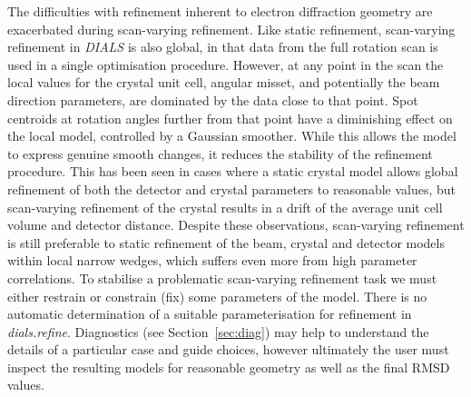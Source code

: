\documentclass[preprint]{iucr}
\newcommand{\dials}{\emph{DIALS}\xspace}
\newcommand{\dialsrefine}{\emph{dials.refine}\xspace}
\begin{document}
The difficulties with refinement inherent to electron diffraction geometry are
exacerbated during scan-varying refinement. Like static
refinement, scan-varying refinement in \dials is also global, in that data from
the full rotation scan is used in a single optimisation procedure. However, at
any point in the scan the local values for the crystal unit cell, angular
misset, and potentially the beam direction parameters, are dominated by the data
close to that point. Spot centroids
at rotation angles further from that point have a diminishing effect on the
local model, controlled by a Gaussian smoother. While this allows the
model to express genuine smooth changes,
it reduces the stability of the refinement procedure. This has been seen in
cases where a static crystal model allows global refinement of both the
detector and crystal parameters to reasonable values, but scan-varying
refinement of the crystal results in a drift of the average unit cell volume
and detector distance. Despite these observations, scan-varying refinement is
still preferable to static refinement of the beam, crystal and detector models
within local narrow wedges, which suffers even more from high parameter
correlations. To stabilise a problematic scan-varying refinement task we must
either restrain or constrain (fix) some parameters of the model. There is no
automatic determination of a suitable parameterisation for refinement in
\dialsrefine. Diagnostics (see Section~\ref{sec:diag}) may help to understand
the details of a particular case and guide choices, however ultimately the user
must inspect the resulting models for reasonable geometry as well as the final
RMSD values.
\end{document}
